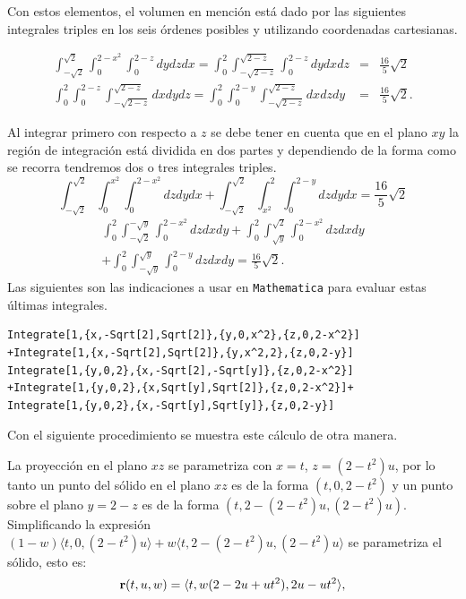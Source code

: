 Con estos elementos, el volumen en mención está dado por las siguientes integrales triples en los seis órdenes posibles y utilizando coordenadas cartesianas.

\begin{eqnarray*}
\int_{-\sqrt{2}}^{\sqrt{2}}\int_{0}^{2-x^2}\int_{0}^{2-z}dydzdx=
\int_{0}^2\int_{-\sqrt{2-z}}^{\sqrt{2-z}}\int_{0}^{2-z}dydxdz&=& \frac{16}{5}\sqrt{2}\\
\int_{0}^2\int_{0}^{2-z}\int_{-\sqrt{2-z}}^{\sqrt{2-z}}dxdydz=
\int_{0}^2\int_{0}^{2-y}\int_{-\sqrt{2-z}}^{\sqrt{2-z}}dxdzdy&=& \frac{16}{5}\sqrt{2}.
\end{eqnarray*}

Al integrar primero con respecto a $z$ se debe tener en cuenta que en el plano $xy$ la región de integración está
dividida en dos partes y dependiendo de la forma como se recorra tendremos dos o tres integrales triples.
\[\int_{-\sqrt{2}}^{\sqrt{2}}\int_{0}^{x^2}\int_{0}^{2-x^2}dzdydx + \int_{-\sqrt{2}}^{\sqrt{2}}\int_{x^2}^2\int_{0}^{2-y}dzdydx= \frac{16}{5}\sqrt{2}\]
\begin{multline*} \int_{0}^2\int_{-\sqrt{2}}^{-\sqrt{y}}\int_{0}^{2-x^2}dzdxdy+\int_{0}^2\int_{\sqrt{y}}^{\sqrt{2}}\int_{0}^{2-x^2}dzdxdy \\
+\int_{0}^2\int_{-\sqrt{y}}^{\sqrt{y}}\int_{0}^{2-y}dzdxdy= \frac{16}{5}%
\sqrt{2}.
\end{multline*}
Las siguientes son las indicaciones a usar en \verb"Mathematica" para evaluar estas últimas integrales.

\begin{tcolorbox}[title=\bf Instrucción en \verb"Mathematica"]\begin{Verbatim}[formatcom=\letraverbatim]
Integrate[1,{x,-Sqrt[2],Sqrt[2]},{y,0,x^2},{z,0,2-x^2}]
+Integrate[1,{x,-Sqrt[2],Sqrt[2]},{y,x^2,2},{z,0,2-y}]
Integrate[1,{y,0,2},{x,-Sqrt[2],-Sqrt[y]},{z,0,2-x^2}]
+Integrate[1,{y,0,2},{x,Sqrt[y],Sqrt[2]},{z,0,2-x^2}]+
Integrate[1,{y,0,2},{x,-Sqrt[y],Sqrt[y]},{z,0,2-y}]
\end{Verbatim}
\end{tcolorbox}

Con el siguiente procedimiento se muestra este cálculo de otra manera.

La proyección en el plano $xz$ se parametriza con $x=t$,
$z=( 2-t^2) u$, por lo tanto un punto del sólido en el plano
$xz$ es de la forma $( t,0,2-t^2) $ y un punto sobre el plano $y=2-z$ es de la forma $( t,2-(2-t^2) u,(2-t^2) u)$.
Simplificando la expresión $(1-w)\langle t,0,(2-t^2) u\rangle +w\langle t,2-( 2-t^2)u,( 2-t^2) u\rangle$
se parametriza el sólido, esto es:
%
\[{\bf r}( t,u,w) =\langle t,w(2-2u+ut^2) ,2u-ut^2\rangle,\]

